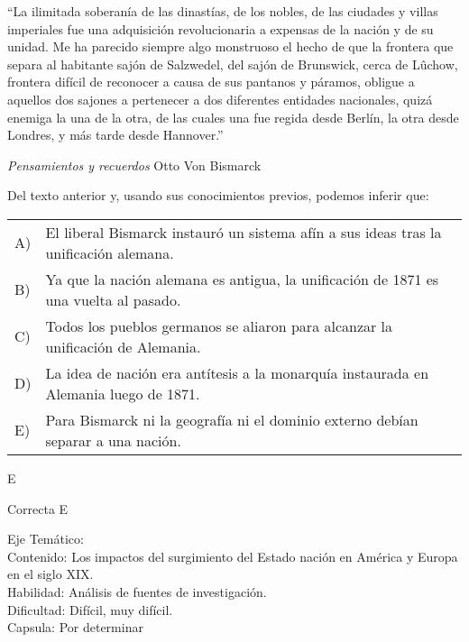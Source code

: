 \documentclass[letterpaper,11pt]{article}
\newcommand{\anchopregunta}{0.9\textwidth}
\begin{document}
\begin{enumerate}
\begin{minipage}{\anchopregunta}
\item ``La ilimitada soberanía de las dinastías, de los nobles, de las ciudades y villas imperiales fue una adquisición revolucionaria a expensas de la nación y de su unidad. Me ha parecido siempre algo monstruoso el hecho de que la frontera que separa al habitante sajón de Salzwedel, del sajón de Brunswick, cerca de Lûchow, frontera difícil de reconocer a causa de sus pantanos y páramos, obligue a aquellos dos sajones a pertenecer a dos diferentes entidades nacionales, quizá enemiga la una de la otra, de las cuales una fue regida desde Berlín, la otra desde Londres, y más tarde desde Hannover.''
\begin{flushright}
\textit{Pensamientos y recuerdos} Otto Von Bismarck
\end{flushright}
Del texto anterior y, usando sus conocimientos previos, podemos inferir que:
\begin{flushleft}\begin{tabular}{@{\hspace{-.001\textwidth}}l@{\hspace{2pt}}p{}}
A)& El liberal Bismarck instauró un sistema afín a sus ideas  tras la unificación alemana.\\
B)& Ya que la nación alemana es antigua, la unificación de 1871 es una vuelta al pasado.\\
C)& Todos los pueblos germanos se aliaron para alcanzar la unificación de Alemania.\\
D)& La idea de nación era antítesis a la monarquía instaurada en Alemania luego de 1871.\\
E)& Para Bismarck ni la geografía ni el dominio externo debían separar a una nación.\\ 
\end{tabular}\end{flushleft}%
\begin{key} E
\end{key} 
\begin{hint}
\end{hint}
\begin{answer} Correcta E \\
\end{answer}
\begin{info} %
\begin{flushleft}
Eje Temático: \\
Contenido: Los impactos del surgimiento del Estado nación en América y Europa en el siglo XIX.\\
Habilidad: Análisis de fuentes de investigación.\\
Dificultad: Difícil, muy difícil.\\
Capsula: Por determinar \\
\end{flushleft} 
\end{info}
\end{minipage}\vfill$\;$ %


\end{enumerate}
\end{document}
